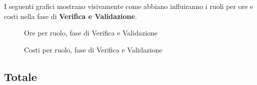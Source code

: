 I seguenti grafici mostrano visivamente come abbiano influiranno i ruoli per ore e costi nella fase di \textbf{Verifica e Validazione}.
\begin{figure}[H]
	\centering
	\caption{Ore per ruolo, fase di Verifica e Validazione}
\end{figure}
\begin{figure}[H]
	\centering
	\caption{Costi per ruolo, fase di Verifica e Validazione}
\end{figure}

\subsection{Totale}
